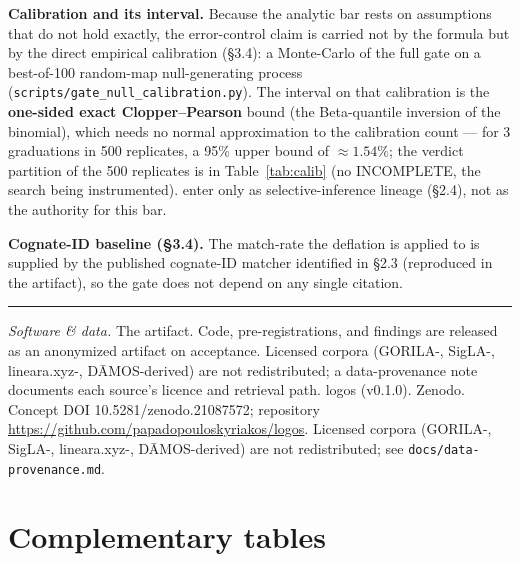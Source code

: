 \textbf{Calibration and its interval.} Because the analytic bar rests on
assumptions that do not hold exactly, the error-control claim is carried not
by the formula but by the direct empirical calibration (\S3.4): a
Monte-Carlo of the full gate on a best-of-100 random-map null-generating
process (\texttt{scripts/\allowbreak gate\_null\_calibration.py}). The
interval on that calibration is the \textbf{one-sided exact
Clopper--Pearson} bound (the Beta-quantile inversion of the binomial), which
needs no normal approximation to the calibration count --- for 3 graduations
in 500 replicates, a 95\% upper bound of $\approx 1.54\%$; the verdict
partition of the 500 replicates is in Table~\ref{tab:calib} (no
INCOMPLETE, the search being instrumented).
\citet{bailey2014} enter only as selective-inference lineage (\S2.4), not as
the authority for this bar.

\textbf{Cognate-ID baseline (\S3.4).} The match-rate the deflation is
applied to is supplied by the published cognate-ID matcher identified in
\S2.3 (reproduced in the artifact), so the gate does not depend on any
single citation.

\begin{center}\rule{0.5\columnwidth}{0.4pt}\end{center}

\noindent\emph{Software \& data.}
\ifanon
The artifact. Code, pre-registrations, and findings are released as an
anonymized artifact on acceptance. Licensed corpora (GORILA-, SigLA-,
lineara.xyz-, D\=AMOS-derived) are not redistributed; a data-provenance note
documents each source's licence and retrieval path.
\else
logos (v0.1.0). Zenodo. Concept DOI 10.5281/zenodo.21087572; repository
\url{https://github.com/papadopouloskyriakos/logos}. Licensed corpora
(GORILA-, SigLA-, lineara.xyz-, D\=AMOS-derived) are not redistributed; see
\texttt{docs/data-provenance.md}.
\fi

\section{Complementary tables}

\begin{table}[h]
\centering\small
{}
\caption{Morphology corpus strata (Appendix~A.1). Seals are structurally
excluded as an abbreviation channel; the strata reconcile exactly to the
1,341-inscription corpus total.}
\label{tab:strata}
\end{table}


